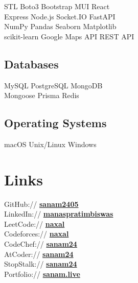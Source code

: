 \documentclass[]{deedy-resume-openfont}
\begin{document}
\begin{minipage}[t]{0.33\textwidth}
STL \textbullet{} Boto3 \textbullet{} Bootstrap \textbullet{} MUI \textbullet{} React\\
Express \textbullet{} Node.js \textbullet{} Socket.IO \textbullet{} FastAPI\\
NumPy \textbullet{} Pandas \textbullet{} Seaborn \textbullet{} Matplotlib \\
scikit-learn \textbullet{} Google Maps API \textbullet{} REST API


\sectionsep

\subsection{Databases}
MySQL \textbullet{} PostgreSQL \textbullet{}  MongoDB  \\
Mongoose \textbullet{}  Prisma \textbullet{} Redis

\sectionsep

\subsection{Operating Systems}
macOS \textbullet{}   Unix/Linux \textbullet{} Windows

\sectionsep
\section{Links} 
\sectionsep
GitHub:// \href{https://github.com/sanam2405}{\bf sanam2405} \\
LinkedIn://  \href{https://www.linkedin.com/in/manas-pratim-biswas/}{\bf manaspratimbiswas} \\
LeetCode:// \href{https://leetcode.com/naxal/}{\bf naxal} \\
Codeforces://  \href{https://codeforces.com/profile/naxal}{\bf naxal} \\
CodeChef://  \href{https://www.codechef.com/users/sanam24}{\bf sanam24} \\
AtCoder://  \href{https://atcoder.jp/users/sanam24}{\bf sanam24} \\
StopStalk:// \href{https://www.stopstalk.com/user/profile/sanam24}{\bf sanam24} \\
Portfolio:// \href{https://sanam.live/}{\bf sanam.live}


%
%

\end{minipage} 
\end{document}
